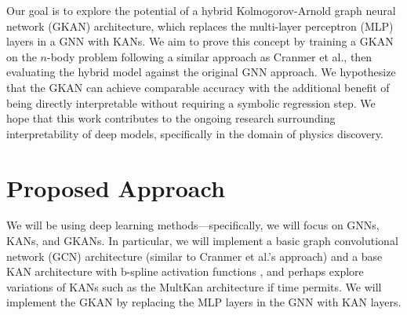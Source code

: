 \documentclass[11pt]{article}
\begin{document}
Our goal is to explore the potential of a hybrid Kolmogorov-Arnold graph neural network (GKAN) architecture,
which replaces the multi-layer perceptron (MLP) layers in a GNN with KANs. We aim to prove this concept by training a GKAN on the
$n$-body problem following a similar approach as Cranmer et al.\cite{cranmer2020discoveringsymbolicmodelsdeep}, then evaluating the hybrid model against the
original GNN approach. We hypothesize that the GKAN can achieve comparable accuracy with the additional benefit
of being directly interpretable without requiring a symbolic regression step. We hope that this work contributes
to the ongoing research surrounding interpretability of deep models, specifically in the domain of physics discovery.


\section{Proposed Approach}



We will be using deep learning methods---specifically, we will focus on GNNs, KANs, and GKANs. In particular, we will implement a basic graph convolutional network (GCN) architecture (similar to Cranmer et al.'s\cite{cranmer2020discoveringsymbolicmodelsdeep} approach) and a base KAN architecture with b-spline activation functions \cite{liu2024kankolmogorovarnoldnetworks}, and perhaps explore variations of KANs such as the MultKan architecture \cite{liu2024kan20kolmogorovarnoldnetworks} if time permits. We will implement the GKAN by replacing the MLP layers in the GNN with KAN layers.
\end{document}
